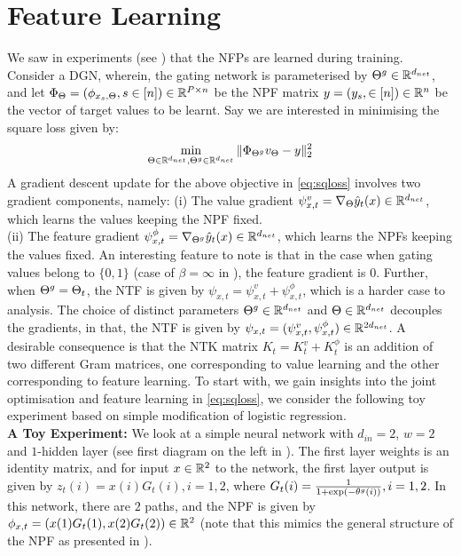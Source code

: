 \section{Feature Learning}
We saw in experiments (see ) that the NFPs are learned during training. 
Consider a DGN, wherein, the gating network is parameterised by ${\Theta}^g\in\mathbb{R}^{d_{net}}$, and let $\Phi_{\Theta}=(\phi_{x_s,\Theta},s\in[n] )\in \mathbb{R}^{P\times n}$ be the NPF matrix $y=(y_s,\in[n])\in\mathbb{R}^n$ be the vector of target values to be learnt. Say we are interested in minimising the square loss given by:
\begin{align}\label{eq:sqloss}
\min_{\Theta\in \mathbb{R}^{d_{net}}, {\Theta}^g\in \mathbb{R}^{d_{net}}}\|\Phi_{{\Theta}^g}v_{\Theta}-y\|^2_2
\end{align}
A gradient descent update for the above objective in \eqref{eq:sqloss} involves two gradient components, namely: 
(i) The value gradient $\psi^v_{x,t}=\nabla_{\Theta} \hat{y}_t(x)\in\mathbb{R}^{d_{net}}$, which learns the values keeping the NPF fixed.\\
(ii) The feature gradient $\psi^{\phi}_{x,t}=\nabla_{{\Theta}^g} \hat{y}_t(x)\in\mathbb{R}^{d_{net}}$, which learns the NPFs keeping the values fixed.
An interesting feature to note is that in the case when gating values belong to $\{0,1\}$ (case of $\beta=\infty$ in ), the feature gradient is $0$. Further, when ${\Theta}^g=\Theta_t$, the NTF is given by $\psi_{x,t}=\psi^v_{x,t}+\psi^{\phi}_{x,t}$, which is a harder case to analysis. The choice of distinct parameters ${\Theta}^g\in\mathbb{R}^{d_{net}}$ and $\Theta\in\mathbb{R}^{d_{net}}$ decouples the gradients, in that, the NTF is given by $\psi_{x,t}=(\psi^v_{x,t},\psi^{\phi}_{x,t})\in\mathbb{R}^{2d_{net}}$. A desirable consequence is that the NTK matrix $K_t=K^v_t+K^{\phi}_t$ is an addition of two different Gram matrices, one corresponding to value learning and the other corresponding to feature learning. 
To start with, we gain insights into the joint optimisation and feature learning in \eqref{eq:sqloss}, we consider the following toy experiment based on simple modification of logistic regression.\\
\textbf{A Toy Experiment:} We look at a simple neural network with $d_{in}=2$, $w=2$ and $1$-hidden layer (see first diagram on the left in ). The first layer weights is an identity matrix, and for input $x\in\mathbb{R}^2$ to the network, the first layer output is given by $z_{t}(i)=x(i)G_t(i),i=1,2$, where $G_t(i)=\frac{1}{1+\exp(-\theta^g(i))},i=1,2$. In this network, there are $2$ paths, and the NPF is given by $\phi_{x,t}=(x(1)G_t(1),x(2)G_t(2))\in \mathbb{R}^2$ (note that this mimics the general structure of the NPF as presented in ).
